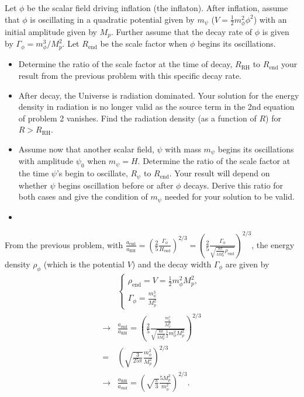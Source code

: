 \clearpage
{}
Let $\phi$ be the scalar field driving inflation (the inflaton). After inflation, assume that $\phi$ is oscillating in a quadratic potential given by $m_\psi$ ($V=\frac{1}{2}m_\phi^2 \phi^2$) with an initial amplitude given by $M_p$. Further assume that the decay rate of $\phi$ is given by $\Gamma_\phi=m_\phi^3/M_p^2$. Let $R_\text{end}$ be the scale factor when $\phi$ begins its oscillations.

\begin{itemize}
    \item [(a)] Determine the ratio of the scale factor at the time of decay, $R_\text{RH}$ to $R_\text{end}$ your result from the previous problem with this specific decay rate.
    \item [(b)] After decay, the Universe is radiation dominated. Your solution for the energy density in radiation is no longer valid as the source term in the 2nd equation of problem 2 vanishes. Find the radiation density (as a function of $R$) for $R>R_\text{RH}$.
    \item [(c)] Assume now that another scalar field, $\psi$ with mass $m_\psi$ begins its oscillations with amplitude $\psi_0$ when $m_\psi=H$. Determine the ratio of the scale factor at the time $\psi$'s begin to oscillate, $R_\psi$ to $R_\text{end}$. Your result will depend on whether $\psi$ begins oscillation before or after $\phi$ decays. Derive this ratio for both cases and give the condition of $m_\psi$ needed for your solution to be valid. 
\end{itemize}
\answer{}
\begin{itemize}
    \item [(a)]
\end{itemize}
From the previous problem, with $\frac{a_\text{end}}{a_\text{RH}} = \left(\frac{2}{5}\frac{\Gamma_\phi  }{H_\text{end}}\right)^{2/3}=\left(\frac{2}{5}\frac{\Gamma_\phi  }{\sqrt{\frac{8\pi}{3M_p^2} \rho_\text{end}}}\right)^{2/3}$, the energy density $\rho_\phi$ (which is the potential $V$) and the decay width $\Gamma_\phi$ are given by 
\begin{align}
    &\begin{cases}
        \rho_\text{end}=V=\frac{1}{2}m_\phi^2 M_p^2,\\
        \Gamma_\phi=\frac{m_\phi^3}{M_p^2}
    \end{cases}\\
    \rightarrow&\frac{a_\text{end}}{a_\text{RH}} =\left(\frac{2}{5} \frac{ \frac{m_\phi^3}{M_p^2}  }{\sqrt{\frac{8\pi}{3M_p^2} \frac{1}{2}m_\phi^2 M_p^2}} \right)^{2/3}\\
    =&\left(\sqrt{\frac{3}{25\pi}}  \frac{m_\phi^2}{M_p^2}  \right)^{2/3}\\
    \rightarrow &\frac{a_\text{RH}}{a_\text{end}}= \left(\sqrt{\frac{\pi}{3}}  \frac{5M_p^2}{m_\phi^2}\right)^{2/3}.
\end{align}

